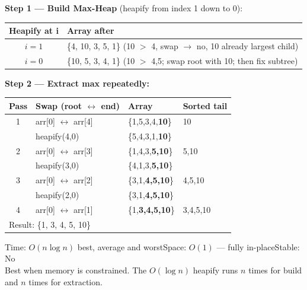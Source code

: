 \documentclass[12pt,a4paper,oneside]{book}
\begin{document}
\begin{dryrun}[Dry Run: arr = \{4, 10, 3, 5, 1\}]
\textbf{Step 1 — Build Max-Heap} (heapify from index 1 down to 0):

\begin{center}
\begin{tabular}{cl}
\toprule
\textbf{Heapify at i} & \textbf{Array after}\\
\midrule
$i=1$ & \{4, 10, 3, 5, 1\} \quad (10 $>$ 4, swap $\to$ no, 10 already largest child)\\
$i=0$ & \{10, 5, 3, 4, 1\} \quad (10 $>$ 4,5; swap root with 10; then fix subtree)\\
\bottomrule
\end{tabular}
\end{center}

\textbf{Step 2 — Extract max repeatedly:}

\begin{center}
\begin{tabular}{clll}
\toprule
\textbf{Pass} & \textbf{Swap (root $\leftrightarrow$ end)} & \textbf{Array} & \textbf{Sorted tail}\\
\midrule
1 & arr[0] $\leftrightarrow$ arr[4] & \{1,5,3,4,\textbf{10}\} & 10\\
  & heapify(4,0) & \{5,4,3,1,\textbf{10}\} & \\
2 & arr[0] $\leftrightarrow$ arr[3] & \{1,4,3,\textbf{5,10}\} & 5,10\\
  & heapify(3,0) & \{4,1,3,\textbf{5,10}\} & \\
3 & arr[0] $\leftrightarrow$ arr[2] & \{3,1,\textbf{4,5,10}\} & 4,5,10\\
  & heapify(2,0) & \{3,1,\textbf{4,5,10}\} & \\
4 & arr[0] $\leftrightarrow$ arr[1] & \{1,\textbf{3,4,5,10}\} & 3,4,5,10\\
\midrule
\multicolumn{4}{l}{Result: \{1, 3, 4, 5, 10\}}\\
\bottomrule
\end{tabular}
\end{center}
\end{dryrun}

\begin{complexity}
Time: $O(n \log n)$ best, average and worst\quad Space: $O(1)$ — fully in-place\quad Stable: No\\[4pt]
Best when memory is constrained. The $O(\log n)$ heapify runs $n$ times for build and $n$ times for extraction.
\end{complexity}
\end{document}
